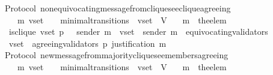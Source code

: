 \begin{isabellebody}
\isanewline
%
\endisadelimproof
\isanewline
\isanewline
\isanewline
\isanewline
{}\isamarkupfalse%
\ {\isacharparenleft}\ Protocol{\isacharparenright}\ non{\isacharunderscore}equivocating{\isacharunderscore}message{\isacharunderscore}from{\isacharunderscore}clique{\isacharunderscore}see{\isacharunderscore}clique{\isacharunderscore}agreeing\ {\isacharcolon}\isanewline
\ \ {\isachardoublequoteopen}{\isasymforall}\ {\isasymsigma}\ {\isasymsigma}{\isacharprime}\ m{\isacharprime}\ v{\isacharunderscore}set{\isachardot}\ {\isacharparenleft}{\isasymsigma}{\isacharcomma}\ {\isasymsigma}{\isacharprime}{\isacharparenright}\ {\isasymin}\ minimal{\isacharunderscore}transitions\ {\isasymand}\ v{\isacharunderscore}set\ {\isasymsubseteq}\ V\isanewline
\ \ {\isasymlongrightarrow}\ m{\isacharprime}\ {\isacharequal}\ the{\isacharunderscore}elem\ {\isacharparenleft}{\isasymsigma}{\isacharprime}\ {\isacharminus}\ {\isasymsigma}{\isacharparenright}\isanewline
\ \ {\isasymlongrightarrow}\ is{\isacharunderscore}clique\ {\isacharparenleft}v{\isacharunderscore}set{\isacharcomma}\ p{\isacharcomma}\ {\isasymsigma}{\isacharparenright}\ {\isasymand}\ sender\ m{\isacharprime}\ {\isasymin}\ v{\isacharunderscore}set\ {\isasymand}\ sender\ m{\isacharprime}\ {\isasymnotin}\ equivocating{\isacharunderscore}validators\ {\isasymsigma}{\isacharprime}\ \isanewline
\ \ {\isasymlongrightarrow}\ v{\isacharunderscore}set\ {\isasymsubseteq}\ agreeing{\isacharunderscore}validators\ {\isacharparenleft}p{\isacharcomma}\ justification\ m{\isacharprime}{\isacharparenright}{\isachardoublequoteclose}\isanewline
%
\isadelimproof
\ \ %
\endisadelimproof
%
\isatagproof
{}\isamarkupfalse%
%
\endisatagproof
{\isafoldproof}%
%
\isadelimproof
\isanewline
%
\endisadelimproof
\isanewline
\isanewline
\isanewline
\isanewline
{}\isamarkupfalse%
\ {\isacharparenleft}\ Protocol{\isacharparenright}\ new{\isacharunderscore}message{\isacharunderscore}from{\isacharunderscore}majority{\isacharunderscore}clique{\isacharunderscore}see{\isacharunderscore}members{\isacharunderscore}agreeing\ {\isacharcolon}\isanewline
\ \ {\isachardoublequoteopen}{\isasymforall}\ {\isasymsigma}\ {\isasymsigma}{\isacharprime}\ m{\isacharprime}\ v{\isacharunderscore}set{\isachardot}\ {\isacharparenleft}{\isasymsigma}{\isacharcomma}\ {\isasymsigma}{\isacharprime}{\isacharparenright}\ {\isasymin}\ minimal{\isacharunderscore}transitions\ {\isasymand}\ v{\isacharunderscore}set\ {\isasymsubseteq}\ V\isanewline
\ \ {\isasymlongrightarrow}\ m{\isacharprime}\ {\isacharequal}\ the{\isacharunderscore}elem\ {\isacharparenleft}{\isasymsigma}{\isacharprime}\ {\isacharminus}\ {\isasymsigma}{\isacharparenright}\isanewline

\end{isabellebody}
